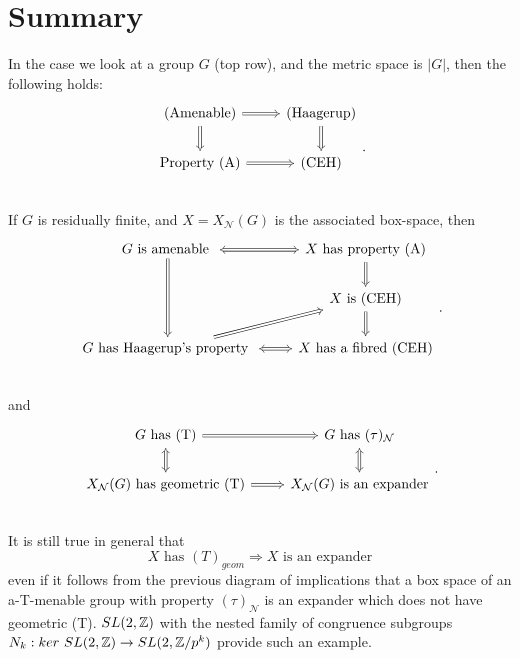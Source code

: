 \section*{Summary}
In the case we look at a group $G$ (top row), and the metric space is $|G|$, then the following holds: 
\[\begin{tikzcd}
\text{(Amenable)} \arrow[r,Rightarrow]\arrow[d,Rightarrow] & \text{(Haagerup)} \arrow[d,Rightarrow]\\
\text{Property (A)} \arrow[r,Rightarrow] & \text{(CEH)} \\
\end{tikzcd}.\]
If $G$ is residually finite, and $X= X_{\mathcal N}(G)$ is the associated box-space, then
\[\begin{tikzcd}
G \text{ is amenable }  \arrow[r,Leftrightarrow]\arrow[dd,Rightarrow] & X \text{ has property (A)} \arrow[d,Rightarrow]\\
	& X \text{ is (CEH)}\arrow[d,Rightarrow] \\
	G \text{ has Haagerup's property }\arrow[ur,Rightarrow]\arrow[r,Leftrightarrow] 	& X \text{ has a fibred (CEH)} \\
\end{tikzcd}.\]
and 
\[\begin{tikzcd}
G \text{ has (T)} \arrow[r,Rightarrow]\arrow[d,Leftrightarrow] & G \text{ has } (\tau)_{\mathcal N}\arrow[d,Leftrightarrow]\\
X_{\mathcal N}(G) \text{ has geometric (T)}\arrow[r,Rightarrow] 	& X_{\mathcal N}(G)\text{ is an expander} \\
\end{tikzcd}.\]
It is still true in general that
\[  X \text{ has } (T)_{geom}\Rightarrow X \text{ is an expander}\]
even if it follows from the previous diagram of implications that a box space of an a-T-menable group with property $(\tau)_{\mathcal N}$ is an expander which does not have geometric (T). $SL(2,\mathbb Z)$ with the nested family of congruence subgroups $N_k : ker \ SL(2,\mathbb Z) \rightarrow SL(2,\mathbb Z / p^k )$ provide such an example.

